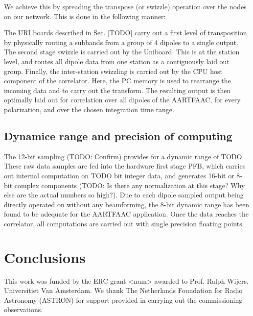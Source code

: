 \documentclass{aa}
\begin{document}
We achieve this by spreading the transpose (or swizzle) operation over the nodes
on our network. This is done in the following manner:
   
The  URI  boards  described  in  Sec.    [TODO]  carry  out  a  first  level  of
transposition by physically  routing a subbands from  a group of 4  dipoles to a
single output. The second stage swizzle is  carried out by the Uniboard. This is
at  the  station level,  and  routes  all dipole  data  from  one station  as  a
contiguously laid out group. Finally, the inter-station swizzling is carried out
by the  CPU host component  of the  correlator. Here, the  PC memory is  used to
rearrange the incoming data and to carry out the transform. The resulting output
is then optimally laid out for correlation over all dipoles of the AARTFAAC, for
every polarization, and over the chosen integration time range.

\subsection {Dynamice range and precision of computing}
The 12-bit sampling (TODO: Confirm) provides  for a dynamic range of TODO. These
raw data samples  are fed into the  hardware first stage PFB,  which carries out
internal computation  on TODO bit  integer data,  and generates 16-bit  or 8-bit
complex components (TODO: Is there any normalization at this stage? Why else are
the actual numbers  so high?). Due to each dipole  sampled output being directly
operated on without  any beamforming, the 8-bit dynamic range  has been found to
be adequate for the AARTFAAC application.  Once the data reaches the correlator,
all computations are carried out with single precision floating points.

\section {\label{sec:conclusion} Conclusions}

\begin {acknowledgements}

This work  was funded  by the ERC  grant <num> awarded  to Prof.   Ralph Wijers,
Universitiet  Van Amsterdam.   We  thank The  Netherlands  Foundation for  Radio
Astronomy  (ASTRON)  for support  provided  in  carrying out  the  commissioning
observations.
\end{acknowledgements}


\end{document}
